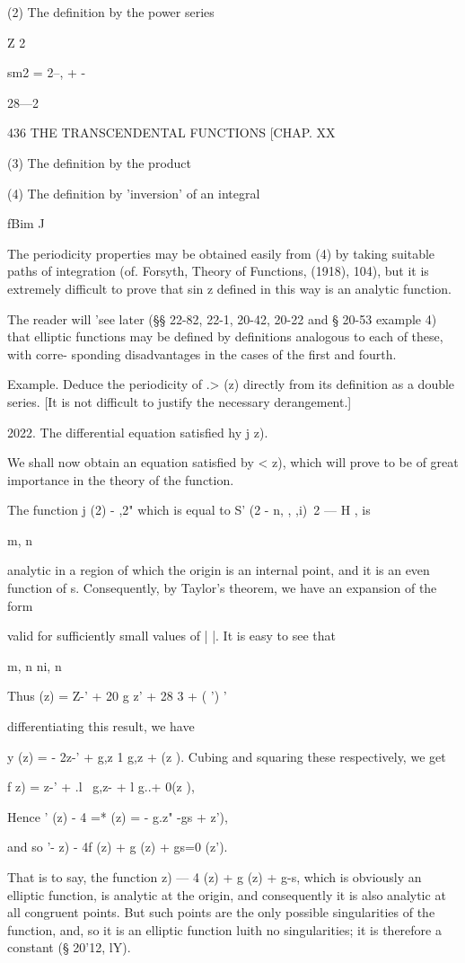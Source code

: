 {(2) The definition by the power series

Z 2

sm2 = 2--, + -

28—2

436 THE TRANSCENDENTAL FUNCTIONS [CHAP. XX

(3) The definition by the product

(4) The definition by 'inversion' of an integral

fBim J

The periodicity properties may be obtained easily from (4) by taking
suitable paths of integration (of. Forsyth, Theory of Functions,
(1918), 104), but it is extremely difficult to prove that sin z
defined in this way is an analytic function.

The reader will 'see later (§§ 22-82, 22-1, 20-42, 20-22 and § 20-53
example 4) that elliptic functions may be defined by definitions
analogous to each of these, with corre- sponding disadvantages in the
cases of the first and fourth.

Example. Deduce the periodicity of .> (z) directly from its definition
as a double series. [It is not difficult to justify the necessary
derangement.]

2022. The differential equation satisfied hy j z).

We shall now obtain an equation satisfied by < z), which will prove to
be of great importance in the theory of the function.

The function j (2) - ,2" which is equal to S' (2 - n, , ,i)~2 — H , is

m, n

analytic in a region of which the origin is an internal point, and it
is an even function of s. Consequently, by Taylor's theorem, we have
an expansion of the form

valid for sufficiently small values of | |. It is easy to see that

m, n ni, n

Thus (z) = Z-' + 20 g z' + 28 3 + ( ') '

differentiating this result, we have

 y (z) = - 2z-' + g,z 1 g,z + (z ). Cubing and squaring these
respectively, we get

f z) = z-' + .l~ g,z- + l g..+ 0(z ),

Hence ' (z) - 4 =* (z) = - g.z" -gs + z'),

and so '- z) - 4f (z) + g (z) + gs=0 (z').

That is to say, the function z) — 4 (z) + g (z) + g-s, which is
obviously an elliptic function, is analytic at the origin, and
consequently it is also analytic at all congruent points. But such
points are the only possible singularities of the function, and, so it
is an elliptic function luith no singularities; it is therefore a
constant (§ 20'12, lY).

}
